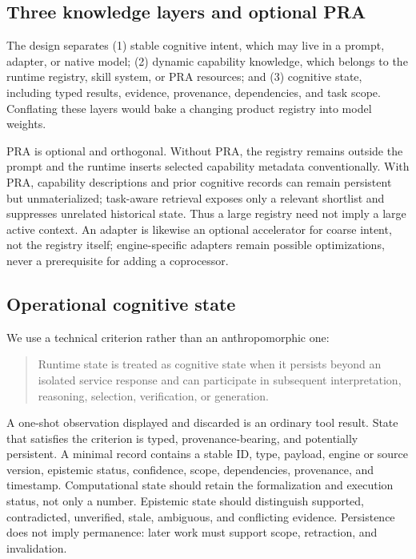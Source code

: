 \documentclass[11pt]{article}
\begin{document}
\subsection{Three knowledge layers and optional PRA}

The design separates (1) stable cognitive intent, which may live in a prompt,
adapter, or native model; (2) dynamic capability knowledge, which belongs to the
runtime registry, skill system, or PRA resources; and (3) cognitive state,
including typed results, evidence, provenance, dependencies, and task scope.
Conflating these layers would bake a changing product registry into model
weights.

PRA is optional and orthogonal. Without PRA, the registry remains outside the
prompt and the runtime inserts selected capability metadata conventionally.
With PRA, capability descriptions and prior cognitive records can remain
persistent but unmaterialized; task-aware retrieval exposes only a relevant
shortlist and suppresses unrelated historical state. Thus a large registry
need not imply a large active context. An adapter is likewise an optional
accelerator for coarse intent, not the registry itself; engine-specific adapters
remain possible optimizations, never a prerequisite for adding a coprocessor.

\subsection{Operational cognitive state}

We use a technical criterion rather than an anthropomorphic one:

\begin{quote}
Runtime state is treated as cognitive state when it persists beyond an isolated
service response and can participate in subsequent interpretation, reasoning,
selection, verification, or generation.
\end{quote}

A one-shot observation displayed and discarded is an ordinary tool result.
State that satisfies the criterion is typed, provenance-bearing, and
potentially persistent.  A minimal record contains a stable ID, type, payload,
engine or source version, epistemic status, confidence, scope, dependencies,
provenance, and timestamp.  Computational state should retain the formalization
and execution status, not only a number.  Epistemic state should distinguish
supported, contradicted, unverified, stale, ambiguous, and conflicting evidence.
Persistence does not imply permanence: later work must support scope,
retraction, and invalidation.
\end{document}
